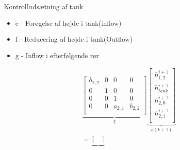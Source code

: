 \begin{frame}{Kontrol}{Indsætning af tank}
\vfill \vfill \centering
\begin{itemize}
	\item e - Forøgelse af højde i tank(inflow)
	\item f - Reducering af højde i tank(Outflow)
	\item g - Inflow i efterfølgende rør
\end{itemize}
\begin{equation*}\label{eq:tank_linear_implement_ss}
\begin{aligned}
      & \underbrace{\begin{bmatrix}
            b_{1,2}   & 0         &0          &0 \\ %
            0         & 1         & 0         &0     \\ %
             0         &  0        & 1         &0  \\ %
            0          &  0         &a_{2,1}    &  b_{2,2}\\ %
       \end{bmatrix}}_{\xi}
        \underbrace{\begin{bmatrix}
        h_{1,2}^{i+1} \\ 
        h_{tank}^{i+1} \\          
        h_{2,0}^{i+1}     \\
        h_{2,1}^{i+1}\\
    \end{bmatrix}}_{x(k+1)}
    \\ &=
    \underbrace{\begin{bmatrix}

\end{bmatrix}}
\end{aligned}
\end{equation*}
\end{frame}
